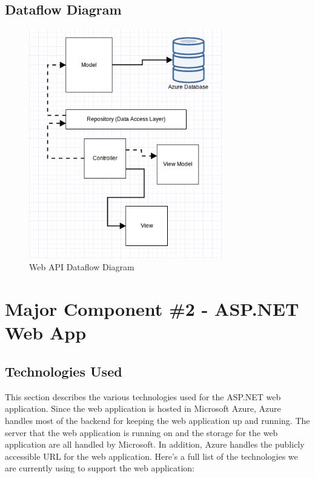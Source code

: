 \pagebreak
\subsection{Dataflow Diagram}
\begin{figure}[tbh]
\begin{center}
\includegraphics[scale=0.5,width=0.75\textwidth]{MVC5.png}
\caption{Web API Dataflow Diagram}
\end{center}
\label{APIMVC}
\end{figure}

\section{Major Component \#2 - ASP.NET Web App}


\subsection{Technologies  Used}
This section describes the various technologies used for the ASP.NET web application. Since the web application is hosted in Microsoft Azure, Azure handles most of the backend for keeping the web application up and running. The server that the web application is running on and the storage for the web application are all handled by Microsoft. In addition, Azure handles the publicly accessible URL for the web application. Here's a full list of the technologies we are currently using to support the web application:

